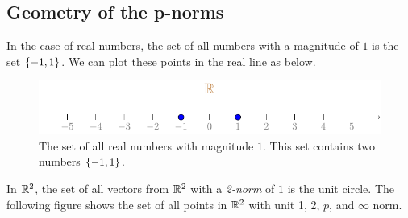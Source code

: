 \subsection{Geometry of the p-norms}
In the case of real numbers, the set of all numbers with a magnitude of $1$ is the set $\left\{ -1, 1 \right\}$. We can plot these points in the real line as below.

\begin{figure}[h]
    \centering
    \includegraphics{figure/chapter01/mag-locus.pdf}
    \caption{The set of all real numbers with magnitude $1$. This set contains two numbers $\left\{ -1, 1 \right\}$.}
    \label{fig:real-line-1-norm}
\end{figure}

In $\mathbb{R}^2$, the set of all vectors from $\mathbb{R}^2$ with a \textit{2-norm} of $1$ is the unit circle. The following figure shows the set of all points in $\mathbb{R}^2$ with unit 1, 2, $p$, and $\infty$ norm.

